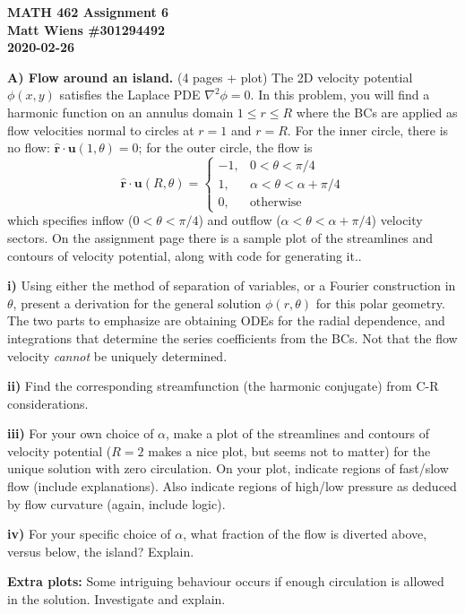 \documentclass{article}
\def\*#1{\mathbf{#1}}
\newcommand{\rhat}{\mathbf{\hat{r}}}
\begin{document}
\textbf{MATH 462 Assignment 6} \\
\textbf{Matt Wiens \#301294492} \\
\textbf{2020-02-26}

\textbf{A) Flow around an island.} (4 pages + plot) The 2D velocity
potential $\phi(x, y)$ satisfies the Laplace PDE $\nabla^2 \phi = 0$. In
this problem, you will find a harmonic function on an annulus domain $1
\leq r \leq R$ where the BCs are applied as flow velocities normal to
circles at $r = 1$ and $r = R$. For the inner circle, there is no flow:
$\rhat \cdot \*u(1, \theta) = 0$; for the outer circle, the flow is
%
\begin{equation*}
    \rhat \cdot \*u(R, \theta) =
        \begin{cases}
            -1, & 0 < \theta < \pi / 4 \\
            1, & \alpha < \theta < \alpha + \pi / 4 \\
            0, & \text{otherwise}
        \end{cases}
\end{equation*}
%
which specifies inflow ($0 < \theta < \pi / 4$) and outflow ($\alpha <
\theta < \alpha + \pi / 4$) velocity sectors. On the assignment page
there is a sample plot of the streamlines and contours of velocity
potential, along with code for generating it..

\textbf{i)} Using either the method of separation of variables, or a
Fourier construction in $\theta$, present a derivation for the general
solution $\phi(r, \theta)$ for this polar geometry. The two parts to
emphasize are obtaining ODEs for the radial dependence, and integrations
that determine the series coefficients from the BCs. Not that the flow
velocity \textit{cannot} be uniquely determined.

\textbf{ii)} Find the corresponding streamfunction (the harmonic
conjugate) from C-R considerations.

\textbf{iii)} For your own choice of $\alpha$, make a plot of the
streamlines and contours of velocity potential ($R = 2$ makes a nice
plot, but seems not to matter) for the unique solution with zero
circulation. On your plot, indicate regions of fast/slow flow (include
explanations). Also indicate regions of high/low pressure as deduced by
flow curvature (again, include logic).

\textbf{iv)} For your specific choice of $\alpha$, what fraction of the
flow is diverted above, versus below, the island? Explain.

\textbf{Extra plots:} Some intriguing behaviour occurs if enough
circulation is allowed in the solution. Investigate and explain.
\end{document}
